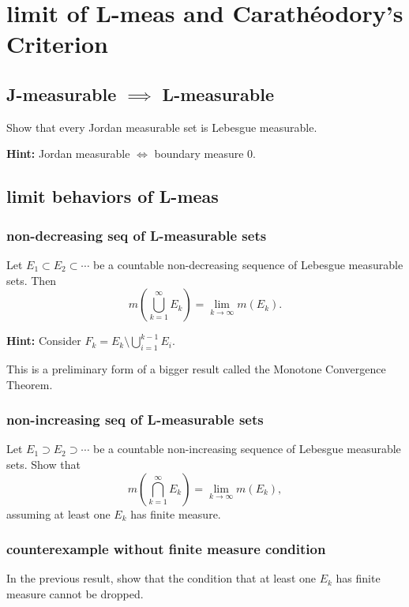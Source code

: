 \documentclass[lang=cn,11pt]{template}
\begin{document}
\chapter{limit of L-meas and Carathéodory's Criterion}
\section{J-measurable $\implies$ L-measurable}
\begin{theorem}
Show that every Jordan measurable set is Lebesgue measurable.
\end{theorem}
\textbf{Hint:} Jordan measurable $\iff$ boundary measure $0$.

\section{limit behaviors of L-meas}
\subsection{non-decreasing seq of L-measurable sets}
\begin{theorem}
Let $E_1 \subset E_2 \subset \cdots$ be a countable non-decreasing sequence of Lebesgue measurable sets. Then
\[
m\left(\bigcup_{k=1}^\infty E_k\right) = \lim_{k \to \infty} m(E_k).
\]
\end{theorem}
\textbf{Hint:} Consider $F_k = E_k \setminus \bigcup_{i=1}^{k-1} E_i$.

\begin{remark}
This is a preliminary form of a bigger result called the Monotone Convergence Theorem.
\end{remark}


\subsection{non-increasing seq of L-measurable sets}
\begin{theorem}
Let $E_1 \supset E_2 \supset \cdots$ be a countable non-increasing sequence of Lebesgue measurable sets. Show that
\[
m\left(\bigcap_{k=1}^\infty E_k\right) = \lim_{k \to \infty} m(E_k),
\]
assuming at least one $E_k$ has finite measure.
\end{theorem}

\subsection{counterexample without finite measure condition}
\begin{remark}
In the previous result, show that the condition that at least one $E_k$ has finite measure cannot be dropped.
\end{remark}
\end{document}
